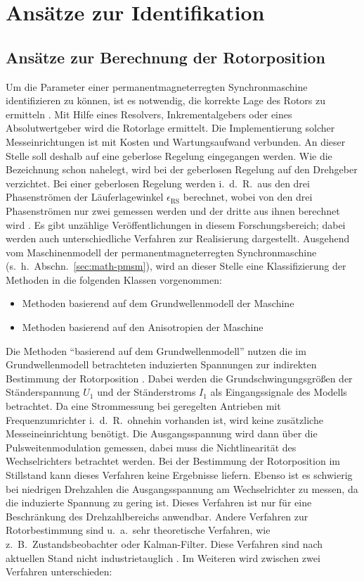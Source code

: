 \documentclass[conference,twocolumn]{IEEEtran}
\newcommand{\x}[1]{\mathrm{#1}}
\begin{document}
\section{Ansätze zur Identifikation}\label{sec:identifikation}
\subsection{Ansätze zur Berechnung der Rotorposition}\label{sec:rotorposition}

Um die Parameter einer permanentmagneterregten Synchronmaschine identifizieren zu können, ist es notwendig, die korrekte Lage des Rotors zu ermitteln \autocites{underwood_online_2010}{rahman_identification_2005}{piippo_adaptation_2009}.
Mit Hilfe eines Resolvers, Inkrementalgebers oder eines Absolutwertgeber wird die Rotorlage ermittelt.
Die Implementierung solcher Messeinrichtungen ist mit Kosten und Wartungsaufwand verbunden.
An dieser Stelle soll deshalb auf eine geberlose Regelung eingegangen werden.
Wie die Bezeichnung schon nahelegt, wird bei der geberlosen Regelung auf den Drehgeber verzichtet.
Bei einer geberlosen Regelung werden i.\ d.\ R.\ aus den drei Phasenströmen der Läuferlagewinkel $\epsilon_\x{RS}$ berechnet, wobei von den drei Phasenströmen nur zwei gemessen werden und der dritte aus ihnen berechnet wird \autocite{ternesfeldkamp}.
Es gibt unzählige Veröffentlichungen in diesem Forschungsbereich; dabei werden auch unterschiedliche Verfahren zur Realisierung dargestellt.
Ausgehend vom Maschinenmodell der permanentmagneterregten Synchronmaschine (s.~h.~Abschn.~\ref{sec:math-pmsm}), wird an dieser Stelle eine Klassifizierung der Methoden in die folgenden Klassen vorgenommen:

\begin{itemize}
	\item Methoden basierend auf dem Grundwellenmodell der Maschine
	\item Methoden basierend auf den Anisotropien der Maschine
\end{itemize}

Die Methoden \enquote{basierend auf dem Grundwellenmodell} nutzen die im Grundwellenmodell betrachteten induzierten Spannungen zur indirekten Bestimmung der Rotorposition \autocite{Perassi2006}.
Dabei werden die Grundschwingungsgrößen der Ständerspannung $U_\x{1}$ und der Ständerstroms $I_\x{1}$ als Eingangssignale des Modells betrachtet.
Da eine Strommessung bei geregelten Antrieben mit Frequenzumrichter i.\ d.\ R.\ ohnehin vorhanden ist, wird keine zusätzliche Messeineinrichtung benötigt.
Die Ausgangsspannung wird dann über die Pulsweitenmodulation gemessen, dabei muss die Nichtlinearität des Wechselrichters betrachtet werden.
Bei der Bestimmung der Rotorposition im Stillstand kann dieses Verfahren keine Ergebnisse liefern.
Ebenso ist es schwierig bei niedrigen Drehzahlen die Ausgangsspannung am Wechselrichter zu messen, da die induzierte Spannung zu gering ist.
Dieses Verfahren ist nur für eine Beschränkung des Drehzahlbereichs anwendbar.
Andere Verfahren zur Rotorbestimmung sind u.\ a.\ sehr theoretische Verfahren, wie z.\ B.\ Zustandsbeobachter oder Kalman-Filter.
Diese Verfahren sind nach aktuellen Stand nicht industrietauglich \autocite{Kellner2012}.
Im Weiteren wird zwischen zwei Verfahren unterschieden:
\end{document}

